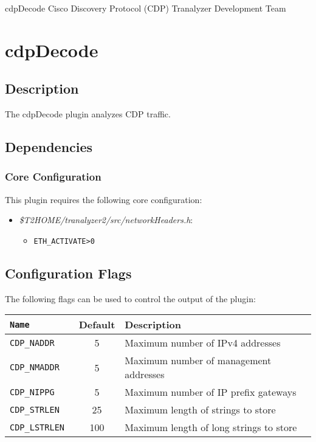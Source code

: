\documentclass[documentation]{subfiles}
\begin{document}
\trantitle
    {cdpDecode} %
    {Cisco Discovery Protocol (CDP)} %
    {Tranalyzer Development Team} %

\section{cdpDecode}\label{s:cdpDecode}

\subsection{Description}
The cdpDecode plugin analyzes CDP traffic.

\subsection{Dependencies}

\subsubsection{Core Configuration}
This plugin requires the following core configuration:
\begin{itemize}
    \item {\em \$T2HOME/tranalyzer2/src/networkHeaders.h}:
        \begin{itemize}
            \item {\tt ETH\_ACTIVATE>0}
        \end{itemize}
\end{itemize}

\subsection{Configuration Flags}
The following flags can be used to control the output of the plugin:
\begin{longtable}{>{\tt}lcl}
    \toprule
    {\bf Name} & {\bf Default} & {\bf Description}\\
    \midrule\endhead%
    CDP\_NADDR   & 5   & Maximum number of IPv4 addresses\\
    CDP\_NMADDR  & 5   & Maximum number of management addresses\\
    CDP\_NIPPG   & 5   & Maximum number of IP prefix gateways\\
    CDP\_STRLEN  & 25  & Maximum length of strings to store\\
    CDP\_LSTRLEN & 100 & Maximum length of long strings to store\\
    \bottomrule
\end{longtable}
\end{document}
